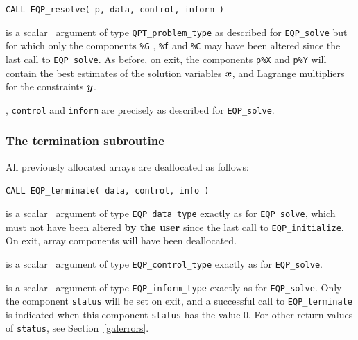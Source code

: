 \documentclass{galahad}
\newcommand{\packagename}{EQP}
\begin{document}
\hspace{8mm}
{\tt CALL \packagename\_resolve( p, data, control, inform )}

\vspace*{-3mm}
\begin{description}
 is a scalar \intentinout\ argument of type 
{\tt QPT\_problem\_type} as described for {\tt \packagename\_solve}
but for which only the components {\tt \%G} , {\tt \%f} and {\tt \%C} 
may have been altered since the last call to 
{\tt \packagename\_solve}.
As before, on exit, the components {\tt p\%X} and {\tt p\%Y}
will contain the best estimates of the solution variables ${\bm{x}}$, and
Lagrange multipliers for the constraints ${\bm{y}}$.

, {\tt control} and {\tt inform} are precisely as described for
 {\tt \packagename\_solve}.
\end{description}


\subsubsection{The  termination subroutine}
All previously allocated arrays are deallocated as follows:
\vspace*{1mm}

\hspace{8mm}
{\tt CALL \packagename\_terminate( data, control, info )}

\begin{description}

 is a scalar \intentinout\ argument of type 
{\tt \packagename\_data\_type} 
exactly as for
{\tt \packagename\_solve},
which must not have been altered {\bf by the user} since the last call to 
{\tt \packagename\_initialize}.
On exit, array components will have been deallocated.

 is a scalar \intentin\ argument of type 
{\tt \packagename\_control\_type}
exactly as for
{\tt \packagename\_solve}.

 is a scalar \intentout\ argument of type
{\tt \packagename\_inform\_type}
exactly as for
{\tt \packagename\_solve}.
Only the component {\tt status} will be set on exit, and a 
successful call to 
{\tt \packagename\_terminate}
is indicated when this  component {\tt status} has the value 0. 
For other return values of {\tt status}, see Section~\ref{galerrors}.

\end{description}
\end{document}
